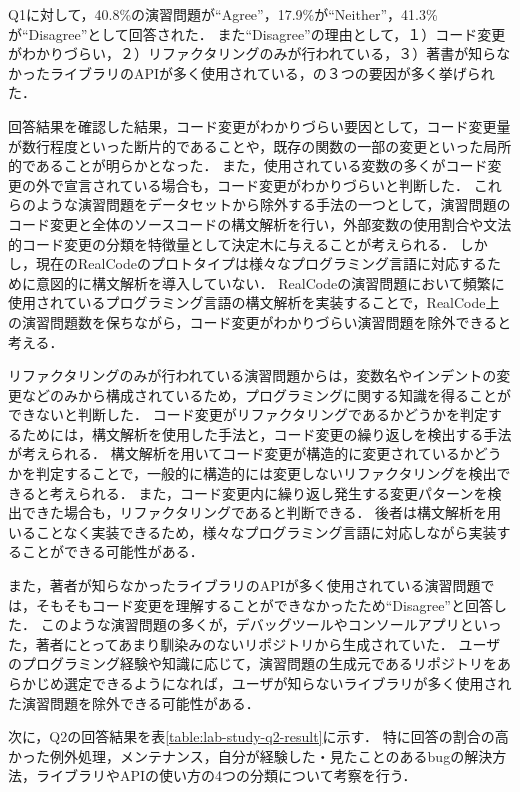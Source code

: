 Q1に対して，40.8\%の演習問題が``Agree''，17.9\%が``Neither''，41.3\%が``Disagree''として回答された．
また``Disagree''の理由として，１）コード変更がわかりづらい，２）リファクタリングのみが行われている，３）著書が知らなかったライブラリのAPIが多く使用されている，の３つの要因が多く挙げられた．

回答結果を確認した結果，コード変更がわかりづらい要因として，コード変更量が数行程度といった断片的であることや，既存の関数の一部の変更といった局所的であることが明らかとなった．
また，使用されている変数の多くがコード変更の外で宣言されている場合も，コード変更がわかりづらいと判断した．
これらのような演習問題をデータセットから除外する手法の一つとして，演習問題のコード変更と全体のソースコードの構文解析を行い，外部変数の使用割合や文法的コード変更の分類を特徴量として決定木に与えることが考えられる．
しかし，現在のRealCodeのプロトタイプは様々なプログラミング言語に対応するために意図的に構文解析を導入していない．
RealCodeの演習問題において頻繁に使用されているプログラミング言語の構文解析を実装することで，RealCode上の演習問題数を保ちながら，コード変更がわかりづらい演習問題を除外できると考える．

リファクタリングのみが行われている演習問題からは，変数名やインデントの変更などのみから構成されているため，プログラミングに関する知識を得ることができないと判断した．
コード変更がリファクタリングであるかどうかを判定するためには，構文解析を使用した手法と，コード変更の繰り返しを検出する手法が考えられる．
構文解析を用いてコード変更が構造的に変更されているかどうかを判定することで，一般的に構造的には変更しないリファクタリングを検出できると考えられる．
また，コード変更内に繰り返し発生する変更パターンを検出できた場合も，リファクタリングであると判断できる．
後者は構文解析を用いることなく実装できるため，様々なプログラミング言語に対応しながら実装することができる可能性がある．

また，著者が知らなかったライブラリのAPIが多く使用されている演習問題では，そもそもコード変更を理解することができなかったため``Disagree''と回答した．
このような演習問題の多くが，デバッグツールやコンソールアプリといった，著者にとってあまり馴染みのないリポジトリから生成されていた．
ユーザのプログラミング経験や知識に応じて，演習問題の生成元であるリポジトリをあらかじめ選定できるようになれば，ユーザが知らないライブラリが多く使用された演習問題を除外できる可能性がある．

次に，Q2の回答結果を表\ref{table:lab-study-q2-result}に示す．
特に回答の割合の高かった例外処理，メンテナンス，自分が経験した・見たことのあるbugの解決方法，ライブラリやAPIの使い方の4つの分類について考察を行う．



